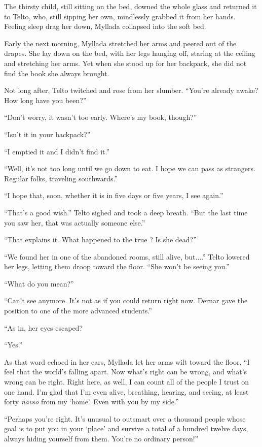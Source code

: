 The thirsty child, still sitting on the bed, downed the whole glass and returned it to Telto, who, still sipping her own, mindlessly grabbed it from her hands. Feeling sleep drag her down, Myllada collapsed into the soft bed.

\centeredstars

Early the next morning, Myllada stretched her arms and peered out of the drapes. She lay down on the bed, with her legs hanging off, staring at the ceiling and stretching her arms. Yet when she stood up for her backpack, she did not find the book she always brought.

Not long after, Telto twitched and rose from her slumber. ``You're already awake? How long have you been?''

``Don't worry, it wasn't too early. Where's my book, though?''

``Isn't it in your backpack?''

``I emptied it and I didn't find it.''

``Well, it's not too long until we go down to eat. I hope we can pass as strangers. Regular folks, traveling southwards.''

``I hope that, soon, whether it is in five days or five years, I see \yronsyncra{} again.''

``That's a good wish.'' Telto sighed and took a deep breath. ``But the last time you saw her, that was actually someone else.''

``That explains it. What happened to the true \yronsyncra? Is she dead?''

``We found her in one of the abandoned rooms, still alive, but....'' Telto lowered her legs, letting them droop toward the floor. ``She won't be seeing you.''

``What do you mean?''

``Can't see anymore. It's not as if you could return right now. Dernar gave the position to one of the more advanced students.''

``As in, her eyes escaped?

``Yes.''

As that word echoed in her ears, Myllada let her arms wilt toward the floor. ``I feel that the world's falling apart. Now what's right can be wrong, and what's wrong can be right. Right here, as well, I can count all of the people I trust on one hand. I'm glad that I'm even alive, breathing, hearing, and seeing, at least forty \emph{navso} from my `home'. Even with you by my side.''

``Perhaps you're right. It's unusual to outsmart over a thousand people whose goal is to put you in your `place' and survive a total of a hundred twelve days, always hiding yourself from them. You're no ordinary person!''

